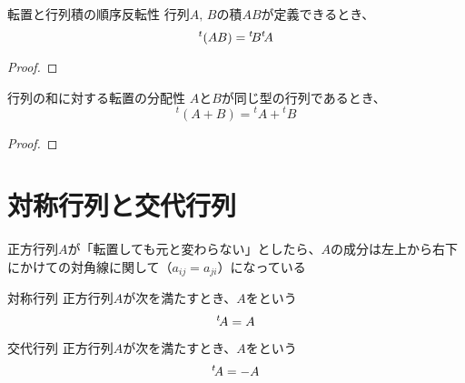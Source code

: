 \documentclass[../../../topic_linear-algebra]{subfiles}
\begin{document}
\sectionline

\begin{theorem}{転置と行列積の順序反転性}\label{thm:transpose-of-product}
  行列$A,\,B$の積$AB$が定義できるとき、
  \begin{equation*}
    {}^t (AB) = {}^t\! B {}^t\! A
  \end{equation*}
\end{theorem}

\begin{proof}
\end{proof}

\sectionline

\begin{theorem}{行列の和に対する転置の分配性}\label{thm:transpose-distributes-over-sum}
  $A$と$B$が同じ型の行列であるとき、
  \begin{equation*}
    {}^t(A + B) = {}^t A + {}^t B
  \end{equation*}
\end{theorem}

\begin{proof}
  \todo{}
\end{proof}

\sectionline
\section{対称行列と交代行列}

正方行列$A$が「転置しても元と変わらない」としたら、$A$の成分は左上から右下にかけての対角線に関して（$a_{ij} = a_{ji}$）になっている

\begin{definition}{対称行列}\label{def:symmetric-matrix}
  正方行列$A$が次を満たすとき、$A$をという
  \begin{equation*}
    {}^t\! A = A
  \end{equation*}
\end{definition}

\begin{definition}{交代行列}
  正方行列$A$が次を満たすとき、$A$をという
  \begin{equation*}
    {}^t\! A = -A
  \end{equation*}
\end{definition}
\end{document}
